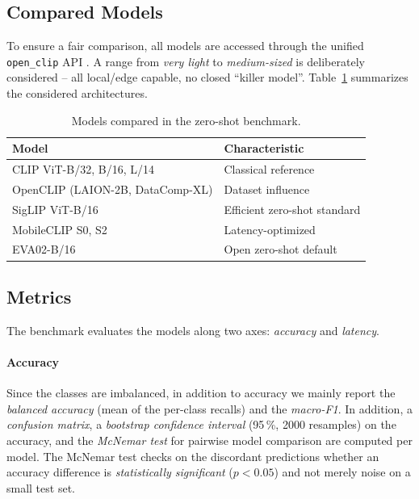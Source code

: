 \documentclass[letterpaper,journal]{IEEEtran}
\begin{document}
\subsection{Compared Models}
To ensure a fair comparison, all models are accessed through the unified
\texttt{open\_clip} API \cite{openclip}. A range from \emph{very light}
to \emph{medium-sized} is deliberately considered -- all local/edge
capable, no closed \enquote{killer model}. Table~\ref{tab:models}
summarizes the considered architectures.

\begin{table}[!t]
\caption{Models compared in the zero-shot benchmark.}
\label{tab:models}
\centering
\small
\begin{tabular}{@{}p{}p{}@{}}
\toprule
\textbf{Model} & \textbf{Characteristic}\\
\midrule
CLIP ViT-B/32, B/16, L/14 \cite{clip} & Classical reference\\
OpenCLIP (LAION-2B, DataComp-XL) \cite{openclip,datacomp} & Dataset influence\\
SigLIP ViT-B/16 \cite{siglip} & Efficient zero-shot standard\\
MobileCLIP S0, S2 \cite{mobileclip} & Latency-optimized\\
EVA02-B/16 \cite{evaclip} & Open zero-shot default\\
\bottomrule
\end{tabular}
\end{table}

\subsection{Metrics}
The benchmark evaluates the models along two axes:
\emph{accuracy} and \emph{latency}.

\paragraph{Accuracy} Since the classes are imbalanced, in addition to
accuracy we mainly report the \emph{balanced accuracy} (mean of the
per-class recalls) and the \emph{macro-F1}. In addition, a
\emph{confusion matrix}, a \emph{bootstrap confidence interval}
(95\,\%, 2000 resamples) on the accuracy, and the \emph{McNemar test}
for pairwise model comparison are computed per model. The McNemar test
checks on the discordant predictions whether an accuracy difference is
\emph{statistically significant} ($p < 0.05$) and not merely noise on a
small test set.
\end{document}

